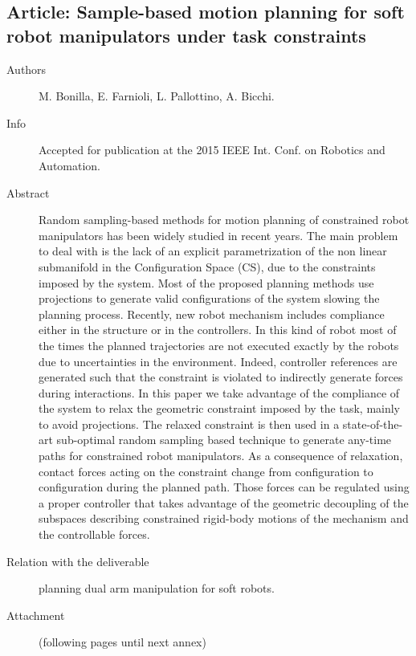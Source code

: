 \documentclass[a4paper,11pt,pdf]{pacmanreport}
\begin{document}
\subsection{Article: Sample-based motion planning for soft robot manipulators under task constraints} \label{ann:softPlanning}
\begin{description}
    \item[Authors] M. Bonilla, E. Farnioli, L. Pallottino, A. Bicchi.
    \item[Info] Accepted for publication at the 2015 IEEE Int. Conf. on Robotics and Automation.
    \item[Abstract] Random sampling-based methods for motion planning of constrained robot manipulators has been widely studied in recent years. The main problem to deal with is the lack of an explicit parametrization of the non linear submanifold in the Configuration Space (CS), due to the constraints imposed by the system. Most of the proposed planning methods use projections to generate valid configurations of the system slowing the planning process. Recently, new robot mechanism includes compliance either in the structure or in the controllers. In this kind of robot most of the times the planned trajectories are not executed exactly by the robots due to uncertainties in the environment. Indeed, controller references are generated such that the constraint is violated to indirectly generate forces during interactions. In this paper we take advantage of the compliance of the system to relax the geometric constraint imposed by the task, mainly to avoid projections. The relaxed constraint is then used in a state-of-the-art sub-optimal random sampling based technique to generate any-time paths for constrained robot manipulators. As a consequence of relaxation, contact forces acting on the constraint change from configuration to configuration during the planned path. Those forces can be regulated using a proper controller that takes advantage of the geometric decoupling of the subspaces describing constrained
    rigid-body motions of the mechanism and the controllable forces.
    \item[Relation with the deliverable] planning dual arm manipulation for soft robots.
    \item[Attachment] (following pages until next annex)
\end{description}

\end{document}
